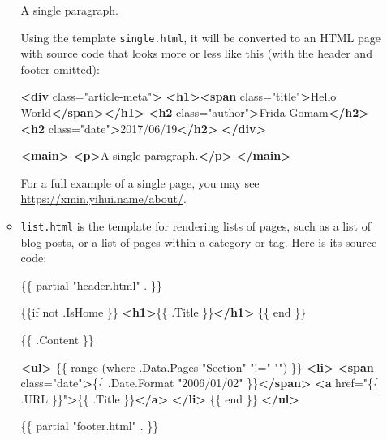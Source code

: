 \documentclass[12pt,]{krantz}
\makeatletter
\newenvironment{Shaded}{\begin{snugshade}}{\end{snugshade}}
\newcommand{\KeywordTok}[1]{\textcolor[rgb]{0.13,0.29,0.53}{\textbf{#1}}}
\newcommand{\StringTok}[1]{\textcolor[rgb]{0.31,0.60,0.02}{#1}}
\newcommand{\OtherTok}[1]{\textcolor[rgb]{0.56,0.35,0.01}{#1}}
\newcommand{\NormalTok}[1]{#1}
\newenvironment{kframe}{%
\medskip{}
\setlength{\fboxsep}{.8em}
 \def\at@end@of@kframe{}%
 \ifinner\ifhmode%
  \def\at@end@of@kframe{\end{minipage}}%
  \begin{minipage}{\columnwidth}%
 \fi\fi%
 \def\FrameCommand##1{\hskip\@totalleftmargin \hskip-\fboxsep
 \colorbox{shadecolor}{##1}\hskip-\fboxsep
     \hskip-\linewidth \hskip-\@totalleftmargin \hskip\columnwidth}%
 \MakeFramed {\advance\hsize-\width
   \@totalleftmargin\z@ \linewidth\hsize
   \@setminipage}}%
 {\par\unskip\endMakeFramed%
 \at@end@of@kframe}
\renewenvironment{Shaded}{\begin{kframe}}{\end{kframe}}
\theoremstyle{definition}
\theoremstyle{definition}
\theoremstyle{definition}
\theoremstyle{remark}
\makeatother
\begin{document}
\begin{itemize}
\begin{itemize}
\begin{Shaded}
\begin{Highlighting}[]
\NormalTok{A single paragraph.}
\end{Highlighting}
\end{Shaded}

    Using the template \texttt{single.html}, it will be converted to an
    HTML page with source code that looks more or less like this (with
    the header and footer omitted):

\begin{Shaded}
\begin{Highlighting}[]
\KeywordTok{<div}\OtherTok{ class=}\StringTok{"article-meta"}\KeywordTok{>}
  \KeywordTok{<h1><span}\OtherTok{ class=}\StringTok{"title"}\KeywordTok{>}\NormalTok{Hello World}\KeywordTok{</span></h1>}
  \KeywordTok{<h2}\OtherTok{ class=}\StringTok{"author"}\KeywordTok{>}\NormalTok{Frida Gomam}\KeywordTok{</h2>}
  \KeywordTok{<h2}\OtherTok{ class=}\StringTok{"date"}\KeywordTok{>}\NormalTok{2017/06/19}\KeywordTok{</h2>}
\KeywordTok{</div>}

\KeywordTok{<main>}
  \KeywordTok{<p>}\NormalTok{A single paragraph.}\KeywordTok{</p>}
\KeywordTok{</main>}
\end{Highlighting}
\end{Shaded}

    For a full example of a single page, you may see
    \url{https://xmin.yihui.name/about/}.
  \item
    \texttt{list.html} is the template for rendering
    lists of pages, such as a list of blog posts, or a list of pages
    within a category or tag. Here is its source code:

\begin{Shaded}
\begin{Highlighting}[]
\NormalTok{\{\{ partial "header.html" . \}\}}

\NormalTok{\{\{if not .IsHome \}\}}
\KeywordTok{<h1>}\NormalTok{\{\{ .Title \}\}}\KeywordTok{</h1>}
\NormalTok{\{\{ end \}\}}

\NormalTok{\{\{ .Content \}\}}

\KeywordTok{<ul>}
\NormalTok{  \{\{ range (where .Data.Pages "Section" "!=" "") \}\}}
  \KeywordTok{<li>}
    \KeywordTok{<span}\OtherTok{ class=}\StringTok{"date"}\KeywordTok{>}\NormalTok{\{\{ .Date.Format "2006/01/02" \}\}}\KeywordTok{</span>}
    \KeywordTok{<a}\OtherTok{ href=}\StringTok{"\{\{ .URL \}\}"}\KeywordTok{>}\NormalTok{\{\{ .Title \}\}}\KeywordTok{</a>}
  \KeywordTok{</li>}
\NormalTok{  \{\{ end \}\}}
\KeywordTok{</ul>}

\NormalTok{\{\{ partial "footer.html" . \}\}}
\end{Highlighting}
\end{Shaded}


\end{itemize}
\end{itemize}
\end{document}
